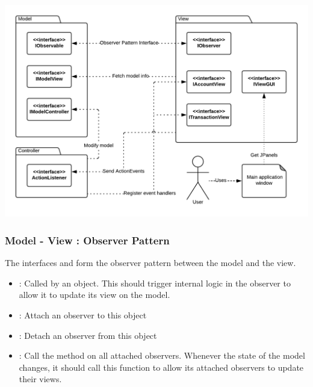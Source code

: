 \documentclass[12pt]{article}
\begin{document}
\includegraphics[width=\textwidth,height=\textheight,keepaspectratio]{diagrams/UML/Subsystem.png}
\bigskip

\subsubsection{Model - View : Observer Pattern}
The interfaces  and  form the observer pattern between the model and the view.\\

\begin{itemize}
	\item {} : Called by an  object. This should trigger internal logic in the observer to allow it to update its view on the model.
\end{itemize}\bigskip

\begin{itemize}
	\item {} : Attach an observer to this object
	\item {} : Detach an observer from this object
	\item {} : Call the  method on all attached observers. Whenever the state of the model changes, it should call this function to allow its attached observers to update their views.
\end{itemize}\bigskip
\end{document}
